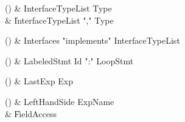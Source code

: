 \begin{bbgrammarappendix}{3.3in}

() & InterfaceTypeList \label{prod:InterfaceTypeList}  \: Type  \\

 &    \| InterfaceTypeList \xcd"," Type \\

\end{bbgrammarappendix}

\begin{bbgrammarappendix}{4.0in}

() & Interfaces \label{prod:Interfaces}  \: \xcd"implements" InterfaceTypeList  \\


\end{bbgrammarappendix}

\begin{bbgrammarappendix}{3.9in}

() & LabeledStmt \label{prod:LabeledStmt}  \: Id \xcd":" LoopStmt  \\


\end{bbgrammarappendix}

\begin{bbgrammarappendix}{4.3in}

() & LastExp \label{prod:LastExp}  \: Exp  \\


\end{bbgrammarappendix}

\begin{bbgrammarappendix}{3.8in}

() & LeftHandSide \label{prod:LeftHandSide}  \: ExpName  \\

 &    \| FieldAccess \\

\end{bbgrammarappendix}

